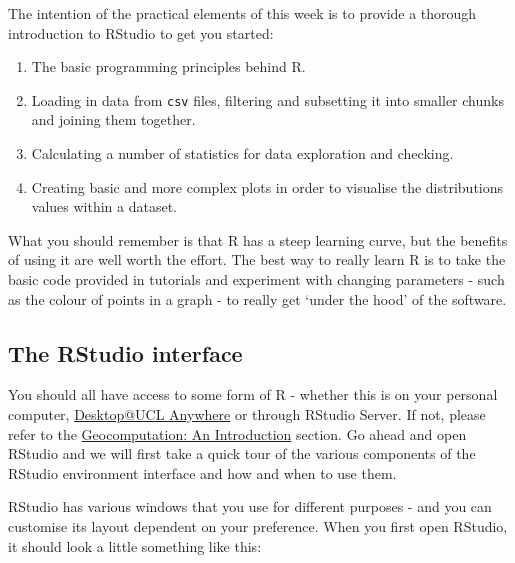 \documentclass[
]{book}
\providecommand{\tightlist}{%
  \setlength{\itemsep}{0pt}\setlength{\parskip}{0pt}}
\begin{document}
The intention of the practical elements of this week is to provide a thorough introduction to RStudio to get you started:

\begin{enumerate}
\def\labelenumi{\arabic{enumi}.}
\tightlist
\item
  The basic programming principles behind R.
\item
  Loading in data from \texttt{csv} files, filtering and subsetting it into smaller chunks and joining them together.
\item
  Calculating a number of statistics for data exploration and checking.
\item
  Creating basic and more complex plots in order to visualise the distributions values within a dataset.
\end{enumerate}

What you should remember is that R has a steep learning curve, but the benefits of using it are well worth the effort. The best way to really learn R is to take the basic code provided in tutorials and experiment with changing parameters - such as the colour of points in a graph - to really get `under the hood' of the software.

\hypertarget{the-rstudio-interface}{%
\subsection{The RStudio interface}\label{the-rstudio-interface}}

You should all have access to some form of R - whether this is on your personal computer, \href{https://www.ucl.ac.uk/isd/services/computers/remote-access/desktopucl-anywhere}{Desktop@UCL Anywhere} or through RStudio Server. If not, please refer to the \protect\hyperlink{geocomputation-an-introduction.htmlux5cux23software}{Geocomputation: An Introduction} section. Go ahead and open RStudio and we will first take a quick tour of the various components of the RStudio environment interface and how and when to use them.

RStudio has various windows that you use for different purposes - and you can customise its layout dependent on your preference. When you first open RStudio, it should look a little something like this:
\end{document}
